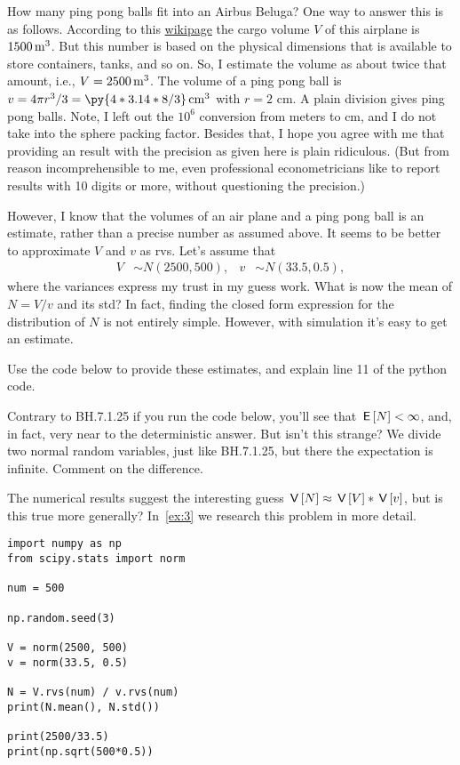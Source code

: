 \documentclass[assignments]{subfiles}
\begin{document}
\begin{exercise}\label{ex:2}
How many ping pong balls fit into an Airbus Beluga?
One way to answer this is as follows.
According to this \href{https://en.wikipedia.org/wiki/Airbus\_Beluga}{wikipage} the cargo volume $V$ of this airplane is $1500 \,\mathrm{m}^{3}$.
But this number is based on the physical dimensions that is available to store containers, tanks, and so on.
So, I estimate the volume as about twice that amount, i.e., $V = 2500 \,\mathrm{m}^{3}$. 
The volume of a ping pong ball is $v = 4 \pi r^3/3  = \py{4*3.14*8/3} \cm^{3}$ with $r=2$ cm.
A plain division gives  ping pong balls.
Note, I left out the $10^{6}$ conversion from meters to cm, and I do not take into the sphere packing factor.
Besides that, I hope you agree with me that providing an result with the precision as given here is plain ridiculous.
(But from reason incomprehensible to me, even professional econometricians like to report results with 10 digits or more, without questioning the precision.)


However, I know that the volumes of an air plane and a ping pong ball is an estimate, rather than a precise number as assumed above.
It seems to be better to approximate $V$ and $v$ as rvs.
Let's assume that
   \begin{align*}
V & \sim N(2500, 500), & v  & \sim N(33.5, 0.5),
\end{align*}
where the variances express my trust in my guess work.
What is now the mean of $N = V/v$ and its std?
In fact, finding the closed form expression for the distribution of $N$ is not entirely simple.
However, with simulation it's easy to get an estimate.

Use the code below to provide these estimates, and explain line 11 of the python code.


Contrary to BH.7.1.25  if you run the code below, you'll see that $\,\mathsf{E}\left[N\right] < \infty$, and, in fact, very near to the deterministic answer. But isn't this strange?  We divide two normal random variables, 
just like BH.7.1.25, but there the expectation is infinite.  Comment on the difference.

The numerical results suggest the interesting guess $\,\mathsf{V}\left[N\right] \approx \,\mathsf{V}\left[V\right] * \,\mathsf{V}\left[v\right]$, but  is this true more generally? In~\cref{ex:3} we research this problem in more detail.

\begin{verbatim}
import numpy as np
from scipy.stats import norm

num = 500

np.random.seed(3)

V = norm(2500, 500)
v = norm(33.5, 0.5)

N = V.rvs(num) / v.rvs(num)
print(N.mean(), N.std())

print(2500/33.5)
print(np.sqrt(500*0.5))
\end{verbatim}
\end{exercise}
\end{document}
